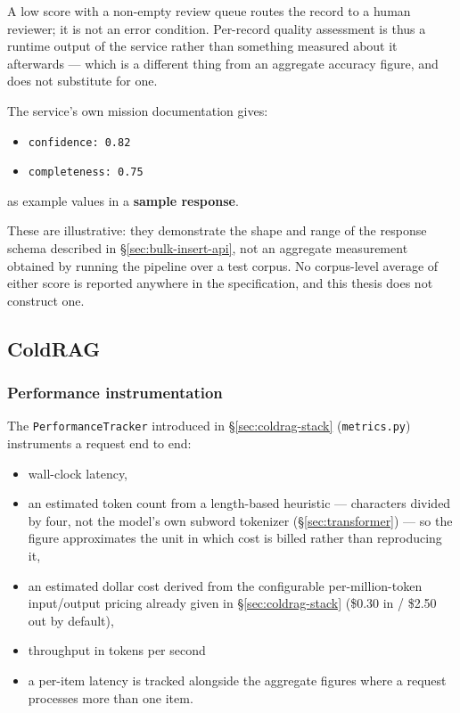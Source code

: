 \vspace{0.3cm}

A low score with a non-empty review queue routes the record to a human reviewer; it is not an error condition. Per-record quality assessment is thus a runtime output of the service rather than something measured about it afterwards — which is a different thing from an aggregate accuracy figure, and does not substitute for one.

\vspace{0.3cm}

The service's own mission documentation gives:
\begin{itemize}
\item \texttt{confidence: 0.82}  
\item \texttt{completeness: 0.75} 
\end{itemize}
as example values in a \textbf{sample response}. 

\vspace{0.3cm}

These are illustrative: they demonstrate the shape and range of the response schema described in \S\ref{sec:bulk-insert-api}, not an aggregate measurement obtained by running the pipeline over a test corpus. No corpus-level average of either score is reported anywhere in the specification, and this thesis does not construct one.

\subsection{ColdRAG}
\label{sec:results-coldrag}

\subsubsection{Performance instrumentation}
\label{sec:results-coldrag-tracker}

The \texttt{PerformanceTracker} introduced in \S\ref{sec:coldrag-stack} (\texttt{metrics.py}) instruments a request end to end: 
\begin{itemize}
\item wall-clock latency, 
\item an estimated token count from a length-based heuristic — characters divided by four, not the model's own subword tokenizer (\S\ref{sec:transformer}) — so the figure approximates the unit in which cost is billed rather than reproducing it, 
\item an estimated dollar cost derived from the configurable per-million-token input/output pricing already given in \S\ref{sec:coldrag-stack} (\$0.30 in / \$2.50 out by default), 
\item throughput in tokens per second 
\item a per-item latency is tracked alongside the aggregate figures where a request processes more than one item. 
\end{itemize}

